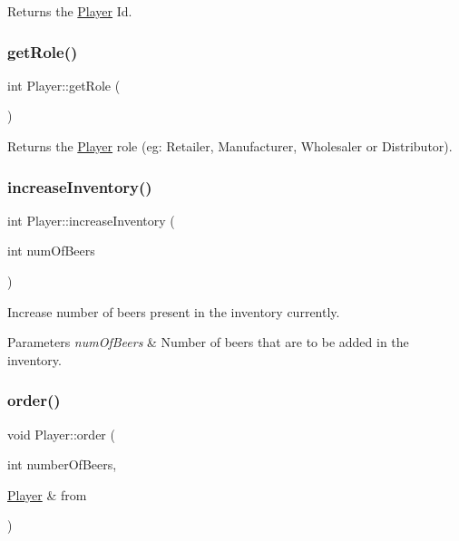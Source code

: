 Returns the \hyperlink{classPlayer}{Player} Id. \mbox{\label{classPlayer_a6baeff2a6218449299cb334c01f1dc28}} 
\subsubsection{\texorpdfstring{get\+Role()}{getRole()}}
{\footnotesize\ttfamily int Player\+::get\+Role (\begin{DoxyParamCaption}{ }\end{DoxyParamCaption})}

Returns the \hyperlink{classPlayer}{Player} role (eg\+: Retailer, Manufacturer, Wholesaler or Distributor). \mbox{\label{classPlayer_af56bd09888271421534c020d51fde332}} 
\subsubsection{\texorpdfstring{increase\+Inventory()}{increaseInventory()}}
{\footnotesize\ttfamily int Player\+::increase\+Inventory (\begin{DoxyParamCaption}\item[{int}]{num\+Of\+Beers }\end{DoxyParamCaption})}

Increase number of beers present in the inventory currently. 
\begin{DoxyParams}{Parameters}
{\em num\+Of\+Beers} & Number of beers that are to be added in the inventory. \\
\hline
\end{DoxyParams}
\mbox{\label{classPlayer_a44d67418e9628bcebb094cb08d2b8645}} 
\subsubsection{\texorpdfstring{order()}{order()}}
{\footnotesize\ttfamily void Player\+::order (\begin{DoxyParamCaption}\item[{int}]{number\+Of\+Beers,  }\item[{\hyperlink{classPlayer}{Player} \&}]{from }\end{DoxyParamCaption})}

